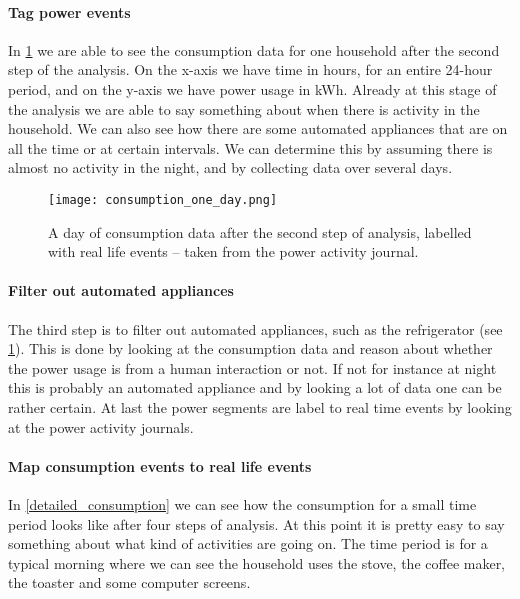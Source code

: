 \paragraph{Tag power events}
In \cref{consumption_one_day} we are able to see the consumption data for one household after the second step of the analysis.
On the x-axis we have time in hours, for an entire 24-hour period, and on the y-axis we have power usage in kWh.
Already at this stage of the analysis we are able to say something about when there is activity in the household.
We can also see how there are some automated appliances that are on all the time or at certain intervals.
We can determine this by assuming there is almost no activity in the night, and by collecting data over several days.


\begin{figure}
  \begin{center}
    \texttt{[image: consumption\_one\_day.png]}
  \end{center}
  \caption{A day of consumption data after the second step of analysis, labelled with real life events -- taken from the power activity journal.}
  \label{consumption_one_day}
\end{figure}

\paragraph{Filter out automated appliances}
The third step is to filter out automated appliances, such as the refrigerator (see \cref{consumption_one_day}).
This is done by looking at the consumption data and reason about whether the power usage is from a human interaction or not.
If not for instance at night this is probably an automated appliance and by looking a lot of data one can be rather certain.
At last the power segments are label to real time events by looking at the power activity journals.

\paragraph{Map consumption events to real life events}
In \cref{detailed_consumption} we can see how the consumption for a small time period looks like after four steps of analysis.
At this point it is pretty easy to say something about what kind of activities are going on.
The time period is for a typical morning where we can see the household uses the stove, the coffee maker, the toaster and some computer screens.

